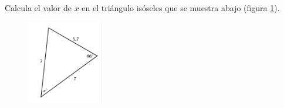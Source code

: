 \question[15]  Calcula el valor de $x$ en el triángulo isóseles  que se muestra abajo (figura \ref{fig:findangle03}).
\begin{figure}[H]
    \begin{center}
        \includegraphics[width=0.3\textwidth]{../images/findangle03.png}
    \end{center}
    \caption{}
    \label{fig:findangle03}
\end{figure}